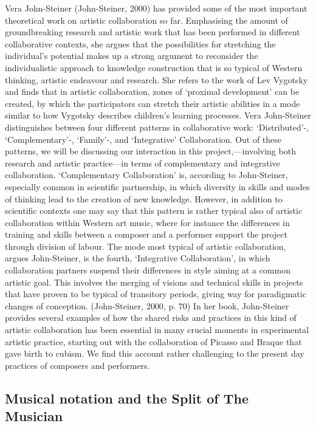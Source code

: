Vera John-Steiner (John-Steiner, 2000) has provided some of the most
important theoretical work on artistic collaboration so
far. Emphasising the amount of groundbreaking research and artistic
work that has been performed in different collaborative contexts, she
argues that the possibilities for stretching the individual's
potential makes up a strong argument to reconsider the individualistic
approach to knowledge construction that is so typical of Western
thinking, artistic endeavour and research. She refers to the work of
Lev Vygotsky and finds that in artistic collaboration, zones of
`proximal development' can be created, by which the participators can
stretch their artistic abilities in a mode similar to how Vygotsky
describes children's learning processes. Vera John-Steiner
distinguishes between four different patterns in collaborative work:
`Distributed'-, `Complementary'-, `Family'-, and `Integrative'
Collaboration.  Out of these patterns, we will be discussing our
interaction in this project,---involving both research and artistic
practice---in terms of complementary and integrative
collaboration. `Complementary Collaboration' is, according to
John-Steiner, especially common in scientific partnership, in which
diversity in skills and modes of thinking lead to the creation of new
knowledge. However, in addition to scientific contexts one may say
that this pattern is rather typical also of artistic collaboration
within Western art music, where for instance the differences in
training and skills between a composer and a performer support the
project through division of labour. The mode most typical of artistic
collaboration, argues John-Steiner, is the fourth, `Integrative
Collaboration', in which collaboration partners suspend their
differences in style aiming at a common artistic goal. This involves
the merging of visions and technical skills in projects that have
proven to be typical of transitory periods, giving way for
paradigmatic changes of conception. (John-Steiner, 2000, p. 70) In her
book, John-Steiner provides several examples of how the shared risks
and practices in this kind of artistic collaboration has been
essential in many crucial moments in experimental artistic practice,
starting out with the collaboration of Picasso and Braque that gave
birth to cubism. We find this account rather challenging to the
present day practices of composers and performers.
 
\subsection{Musical notation and the Split of The Musician }
\label{sec:music-notat-split}

